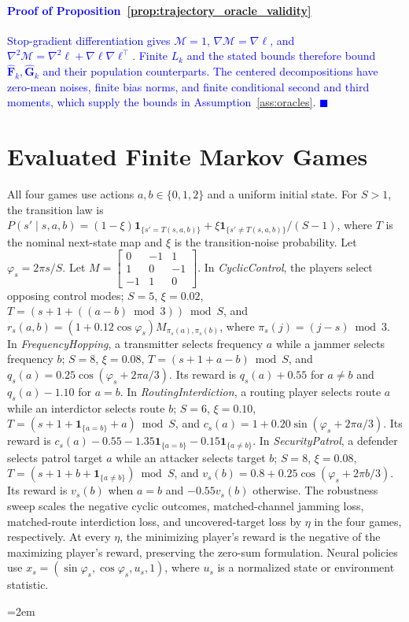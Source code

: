 \documentclass[journal]{IEEEtran}
\theoremstyle{remark}
\newcommand{\hatF}{\widehat{\boldsymbol{F}}}
\newcommand{\hatG}{\widehat{\boldsymbol{G}}}
\begin{document}
	\paragraph{\textcolor{blue}{Proof of Proposition~\ref{prop:trajectory_oracle_validity}}}\label{app:trajectory_oracle_validity}
	\textcolor{blue}{Stop-gradient differentiation gives $\mathcal M=1$, $\nabla\mathcal M=\nabla\ell$, and $\nabla^2\mathcal M=\nabla^2\ell+\nabla\ell\nabla\ell^{\top}$. Finite $L_k$ and the stated bounds therefore bound $\hatF_k,\hatG_k$ and their population counterparts. The centered decompositions have zero-mean noises, finite bias norms, and finite conditional second and third moments, which supply the bounds in Assumption~\ref{ass:oracles}.}
	\hfill\textcolor{blue}{$\blacksquare$}
	
\section{Evaluated Finite Markov Games}\label{app:environments}
All four games use actions $a,b\in\{0,1,2\}$ and a uniform initial state.
For $S>1$, the transition law is $P(s'\mid s,a,b)=(1-\xi)\mathbf 1_{\{s'=T(s,a,b)\}}+\xi\mathbf 1_{\{s'\ne T(s,a,b)\}}/(S-1)$, where $T$ is the nominal next-state map and $\xi$ is the transition-noise probability.
Let $\varphi_s=2\pi s/S$.
Let $M=\left[\begin{smallmatrix}0&-1&1\\1&0&-1\\-1&1&0\end{smallmatrix}\right]$.
In \emph{CyclicControl}, the players select opposing control modes; $S=5$, $\xi=0.02$, $T=(s+1+((a-b)\bmod3))\bmod S$, and $r_s(a,b)=(1+0.12\cos\varphi_s)M_{\pi_s(a),\pi_s(b)}$, where $\pi_s(j)=(j-s)\bmod3$.
In \emph{FrequencyHopping}, a transmitter selects frequency $a$ while a jammer selects frequency $b$; $S=8$, $\xi=0.08$, $T=(s+1+a-b)\bmod S$, and $q_s(a)=0.25\cos(\varphi_s+2\pi a/3)$.
Its reward is $q_s(a)+0.55$ for $a\ne b$ and $q_s(a)-1.10$ for $a=b$.
In \emph{RoutingInterdiction}, a routing player selects route $a$ while an interdictor selects route $b$; $S=6$, $\xi=0.10$, $T=(s+1+\mathbf 1_{\{a=b\}}+a)\bmod S$, and $c_s(a)=1+0.20\sin(\varphi_s+2\pi a/3)$.
Its reward is $c_s(a)-0.55-1.35\mathbf 1_{\{a=b\}}-0.15\mathbf 1_{\{a\ne b\}}$.
In \emph{SecurityPatrol}, a defender selects patrol target $a$ while an attacker selects target $b$; $S=8$, $\xi=0.08$, $T=(s+1+b+\mathbf 1_{\{a\ne b\}})\bmod S$, and $v_s(b)=0.8+0.25\cos(\varphi_s+2\pi b/3)$.
Its reward is $v_s(b)$ when $a=b$ and $-0.55v_s(b)$ otherwise.
The robustness sweep scales the negative cyclic outcomes, matched-channel jamming loss, matched-route interdiction loss, and uncovered-target loss by $\eta$ in the four games, respectively.
At every $\eta$, the minimizing player's reward is the negative of the maximizing player's reward, preserving the zero-sum formulation.
Neural policies use $x_s=(\sin\varphi_s,\cos\varphi_s,u_s,1)$, where $u_s$ is a normalized state or environment statistic.

\begingroup
\emergencystretch=2em
	
	
	\endgroup
\end{document}
